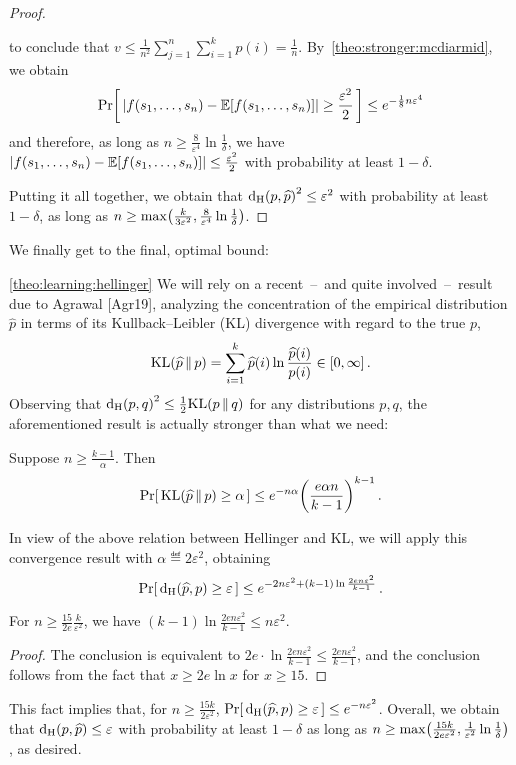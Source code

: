 \documentclass[10pt]{article}
\newcommand{\dst}{\varepsilon}
\newcommand{\ab}{k}
\newcommand{\ns}{n}
\begin{document}
\begin{proof}
\begin{itemize}
\[      \]
      to conclude that $v \leq \frac{1}{\ns^2} \sum_{j=1}^\ns \sum_{i=1}^\ab p(i)  = \frac{1}{\ns}$. By~\autoref{theo:stronger:mcdiarmid}, we obtain
      \[
          \probaOf{ \abs{f(s_1,\dots,s_\ns)-\expect{f(s_1,\dots,s_\ns)}} \geq \frac{\dst^2}{2} } \leq e^{-\frac{1}{8}\ns\dst^4}
      \]
      and therefore, as long as $\ns \geq \frac{8}{\dst^4}\ln\frac{1}{\delta}$, we have $\abs{f(s_1,\dots,s_\ns)-\expect{f(s_1,\dots,s_\ns)}} \leq \frac{\dst^2}{2}$ with probability at least $1-\delta$.
    \end{itemize}
    Putting it all together, we obtain that $\hellinger{p}{\widehat{p}}^2 \leq \dst^2$ with probability at least $1-\delta$, as long as $\ns \geq \max\mleft( \frac{\ab}{3\dst^2}, \frac{8}{\dst^4}\ln\frac{1}{\delta}\mright)$.
\end{proof}
\noindent We finally get to the final, optimal bound:
\begin{proofof}{\autoref{theo:learning:hellinger}}
We will rely on a recent~--~and quite involved~--~result due to Agrawal [Agr19], analyzing the concentration of the empirical distribution $\widehat{p}$ in terms of its Kullback--Leibler (KL) divergence with regard to the true $p$,
\[
    \kldiv{\widehat{p}}{p} = \sum_{i=1}^\ab \widehat{p}(i) \ln \frac{\widehat{p}(i)}{p(i)} \in[0,\infty]\,.
\]
Observing that $\hellinger{p}{q}^2 \leq \frac{1}{2} \kldiv{p}{q}$ for any distributions $p, q$, the aforementioned result is actually stronger than what we need:
\begin{theorem}
  Suppose $\ns \geq \frac{\ab-1}{\alpha}$. Then
  \[
      \probaOf{ \kldiv{\widehat{p}}{p} \geq \alpha } \leq e^{-\ns\alpha}\mleft(\frac{e\alpha\ns}{\ab-1}\mright)^{\ab-1}\,.
  \]
\end{theorem}
\noindent In view of the above relation between Hellinger and KL, we will apply this convergence result with $\alpha \eqdef 2\dst^2$, obtaining
  \[
      \probaOf{ \hellinger{\widehat{p}}{p} \geq \dst } \leq e^{-2\ns\dst^2 + (\ab-1)\ln\frac{2e\ns\dst^2}{\ab-1}}\,.
  \]
  \begin{fact}
      For $\ns \geq \frac{15}{2e}\frac{\ab}{\dst^2}$, we have $(\ab-1)\ln\frac{2e\ns\dst^2}{\ab-1}\leq \ns\dst^2$. 
  \end{fact}
  \begin{proof}
  The conclusion is equivalent to $2e\cdot\ln\frac{2e\ns\dst^2}{\ab-1}\leq \frac{2e\ns\dst^2}{\ab-1}$, and the conclusion follows from the fact that $x\geq 2e \ln x$ for $x\geq 15$.
  \end{proof}
  \noindent This fact implies that, for $\ns \geq \frac{15\ab}{2\dst^2}$, $\probaOf{ \hellinger{\widehat{p}}{p} \geq \dst } \leq e^{-\ns\dst^2}$. Overall, we obtain that $\hellinger{p}{\widehat{p}} \leq \dst$ with probability at least $1-\delta$ as long as $\ns \geq \max\mleft( \frac{15\ab}{2e\dst^2}, \frac{1}{\dst^2}\ln\frac{1}{\delta}\mright)$, as desired.
\end{proofof}
\end{document}
